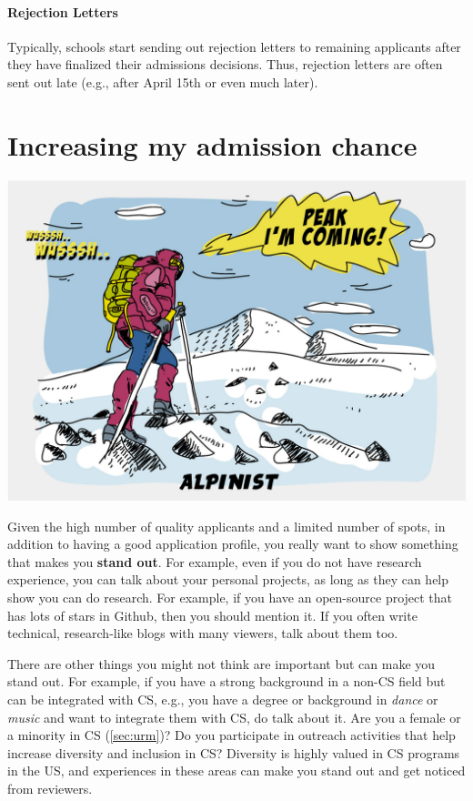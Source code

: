 \documentclass[oneside,11pt,dvipsnames]{book}
\begin{document}
\paragraph{Rejection Letters} Typically, schools start sending out rejection letters to remaining applicants after they have finalized their admissions decisions. Thus, rejection letters are often sent out late (e.g., after April 15th or even much later).

\section{Increasing my admission chance}\label{sec:improve-your-chance}

\begin{center}
  \includegraphics[scale=0.2]{files/alpinist-climbing-peak-mountain-comic-hand-drawn-vector-illustration.jpg}
\end{center}


Given the high number of quality applicants and a limited number of spots, in addition to having a good application profile, you really want to show something that makes you \textbf{stand out}.  For example, even if you do not have research experience, you can talk about your personal projects, as long as they can help show you can do research. For example, if you have an open-source project that has lots of stars in Github, then you should mention it. If you often write technical, research-like blogs with many viewers, talk about them too.

There are other things you might not think are important but can make you stand out. For example, if you have a strong background in a non-CS field but can be integrated with CS, e.g., you have a degree or background in \emph{dance} or \emph{music} and want to integrate them with CS, do talk about it. Are you a female or a minority in CS (\autoref{sec:urm})? Do you participate in outreach activities that help increase diversity and inclusion in CS? Diversity is highly valued in CS programs in the US, and experiences in these areas can make you stand out and get noticed from reviewers.
\end{document}
